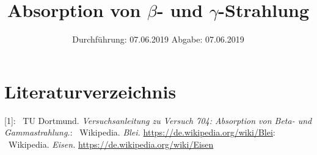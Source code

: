 

\subject{Nr. 704}
\title{\texorpdfstring{Absorption von $\beta$- und $\gamma$-Strahlung}{Absorption von Beta- und Gamma-Strahlung}}
\date{%
  Durchführung: 07.06.2019
  \hspace{3em}
  Abgabe: 07.06.2019
}



\maketitle
\thispagestyle{empty}
\tableofcontents
\newpage






\section{Literaturverzeichnis}

[1]: \ TU Dortmund. \textit{Versuchsanleitung zu Versuch 704:
Absorption von Beta- und Gammastrahlung.}\newline
[1]: \ Wikipedia. \textit{Blei.} \url{https://de.wikipedia.org/wiki/Blei}\newline
[1]: \ Wikipedia. \textit{Eisen.} \url{https://de.wikipedia.org/wiki/Eisen}\newline

\printbibliography{}


